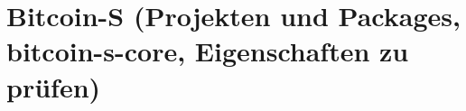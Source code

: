 \section{Bitcoin-S (Projekten und Packages, bitcoin-s-core, Eigenschaften zu prüfen)}
\label{sec:bitcoin_s}




